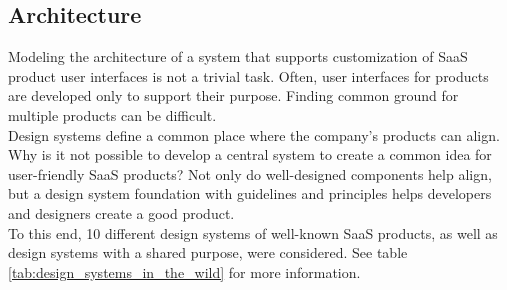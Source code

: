 \subsection{Architecture}
Modeling the architecture of a system that supports customization of SaaS product user interfaces is not a trivial task. Often, user interfaces for products are developed only to support their purpose. Finding common ground for multiple products can be difficult.  \\
Design systems define a common place where the company's products can align. Why is it not possible to develop a central system to create a common idea for user-friendly SaaS products? Not only do well-designed components help align, but a design system foundation with guidelines and principles helps developers and designers create a good product. \\
To this end, 10 different design systems of well-known SaaS products, as well as design systems with a shared purpose, were considered. See table \ref{tab:design_systems_in_the_wild} for more information.
\newpage
